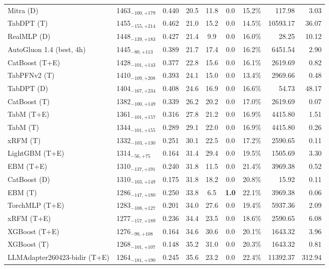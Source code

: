 \begin{tabular}{llcccccrr}
Mitra (D) & 1463${}_{-100,+179}$ & 0.440 & 20.5 & 11.8 & 0.0 & 15.2\% & 117.98 & 3.03 \\
TabDPT (T) & 1455${}_{-155,+214}$ & 0.462 & 21.0 & 15.2 & 0.0 & 14.5\% & 10593.17 & 36.07 \\
RealMLP (D) & 1448${}_{-139,+183}$ & 0.427 & 21.4 & 9.9 & 0.0 & 16.0\% & 28.25 & 10.12 \\
AutoGluon 1.4 (best, 4h) & 1445${}_{-80,+113}$ & 0.389 & 21.7 & 17.4 & 0.0 & 16.2\% & 6451.54 & 2.90 \\
CatBoost (T+E) & 1428${}_{-101,+143}$ & 0.377 & 22.8 & 15.6 & 0.0 & 16.1\% & 2619.69 & 0.82 \\
TabPFNv2 (T) & 1410${}_{-109,+208}$ & 0.393 & 24.1 & 15.0 & 0.0 & 13.4\% & 2969.66 & 0.48 \\
TabDPT (D) & 1404${}_{-167,+234}$ & 0.408 & 24.6 & 16.9 & 0.0 & 16.6\% & 54.73 & 48.17 \\
CatBoost (T) & 1382${}_{-100,+149}$ & 0.339 & 26.2 & 20.2 & 0.0 & 17.0\% & 2619.69 & 0.07 \\
TabM (T+E) & 1361${}_{-101,+157}$ & 0.316 & 27.8 & 21.2 & 0.0 & 16.9\% & 4415.80 & 1.51 \\
TabM (T) & 1344${}_{-101,+155}$ & 0.289 & 29.1 & 22.0 & 0.0 & 16.9\% & 4415.80 & 0.26 \\
xRFM (T) & 1332${}_{-103,+130}$ & 0.251 & 30.1 & 22.5 & 0.0 & 17.2\% & 2590.65 & 0.11 \\
LightGBM (T+E) & 1314${}_{-56,+75}$ & 0.164 & 31.4 & 29.4 & 0.0 & 19.5\% & 1505.69 & 3.30 \\
EBM (T+E) & 1310${}_{-137,+191}$ & 0.240 & 31.8 & 11.5 & 0.0 & 21.4\% & 3969.38 & 0.52 \\
CatBoost (D) & 1310${}_{-103,+149}$ & 0.175 & 31.8 & 18.2 & 0.0 & 20.8\% & 15.92 & 0.11 \\
EBM (T) & 1286${}_{-147,+180}$ & 0.250 & 33.8 & 6.5 & \textcolor{bronze}{\textbf{1.0}} & 22.1\% & 3969.38 & 0.06 \\
TorchMLP (T+E) & 1283${}_{-108,+127}$ & 0.201 & 34.0 & 27.6 & 0.0 & 19.4\% & 5937.36 & 2.09 \\
xRFM (T+E) & 1277${}_{-157,+189}$ & 0.236 & 34.4 & 23.5 & 0.0 & 18.6\% & 2590.65 & 6.08 \\
XGBoost (T+E) & 1276${}_{-98,+108}$ & 0.164 & 34.6 & 30.6 & 0.0 & 20.1\% & 1643.32 & 3.96 \\
XGBoost (T) & 1268${}_{-101,+107}$ & 0.148 & 35.2 & 31.0 & 0.0 & 20.3\% & 1643.32 & 0.81 \\
LLMAdapter260423-bidir (T+E) & 1264${}_{-181,+190}$ & 0.245 & 35.6 & 23.2 & 0.0 & 22.4\% & 11392.37 & 312.94 \\

\end{tabular}

